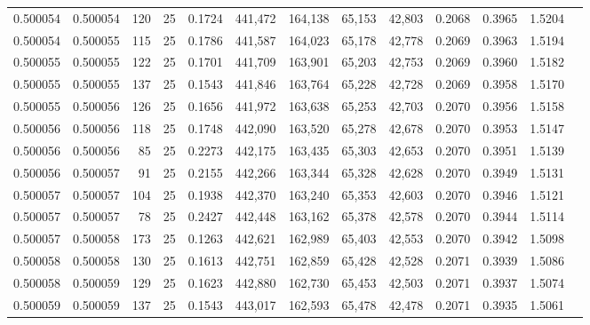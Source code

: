 \begin{tabular}{rrrrrrrrrrrrr}
0.500054 & 0.500054 & 120 &  25 &                                     0.1724 & 441,472 & 164,138 &  65,153 &  42,803 & 0.2068 & 0.3965 & 1.5204 \\
0.500054 & 0.500055 & 115 &  25 &                                     0.1786 & 441,587 & 164,023 &  65,178 &  42,778 & 0.2069 & 0.3963 & 1.5194 \\
0.500055 & 0.500055 & 122 &  25 &                                     0.1701 & 441,709 & 163,901 &  65,203 &  42,753 & 0.2069 & 0.3960 & 1.5182 \\
0.500055 & 0.500055 & 137 &  25 &                                     0.1543 & 441,846 & 163,764 &  65,228 &  42,728 & 0.2069 & 0.3958 & 1.5170 \\
0.500055 & 0.500056 & 126 &  25 &                                     0.1656 & 441,972 & 163,638 &  65,253 &  42,703 & 0.2070 & 0.3956 & 1.5158 \\
0.500056 & 0.500056 & 118 &  25 &                                     0.1748 & 442,090 & 163,520 &  65,278 &  42,678 & 0.2070 & 0.3953 & 1.5147 \\
0.500056 & 0.500056 &  85 &  25 &                                     0.2273 & 442,175 & 163,435 &  65,303 &  42,653 & 0.2070 & 0.3951 & 1.5139 \\
0.500056 & 0.500057 &  91 &  25 &                                     0.2155 & 442,266 & 163,344 &  65,328 &  42,628 & 0.2070 & 0.3949 & 1.5131 \\
0.500057 & 0.500057 & 104 &  25 &                                     0.1938 & 442,370 & 163,240 &  65,353 &  42,603 & 0.2070 & 0.3946 & 1.5121 \\
0.500057 & 0.500057 &  78 &  25 &                                     0.2427 & 442,448 & 163,162 &  65,378 &  42,578 & 0.2070 & 0.3944 & 1.5114 \\
0.500057 & 0.500058 & 173 &  25 &                                     0.1263 & 442,621 & 162,989 &  65,403 &  42,553 & 0.2070 & 0.3942 & 1.5098 \\
0.500058 & 0.500058 & 130 &  25 &                                     0.1613 & 442,751 & 162,859 &  65,428 &  42,528 & 0.2071 & 0.3939 & 1.5086 \\
0.500058 & 0.500059 & 129 &  25 &                                     0.1623 & 442,880 & 162,730 &  65,453 &  42,503 & 0.2071 & 0.3937 & 1.5074 \\
0.500059 & 0.500059 & 137 &  25 &                                     0.1543 & 443,017 & 162,593 &  65,478 &  42,478 & 0.2071 & 0.3935 & 1.5061 \\

\end{tabular}
